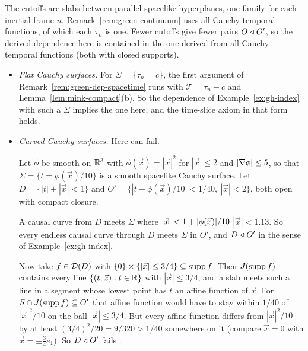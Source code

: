 \begin{remark}\label{rem:mink-slabs}
The cutoffs are slabs between parallel spacelike hyperplanes, one family
for each inertial frame $n$. Remark~\ref{rem:green-continuum} uses all Cauchy temporal functions, of
which each $\tau_n$ is one. Fewer cutoffs give fewer pairs $O\mathrel{\triangleleft} O'$, so the derived dependence here
is contained in the one derived from all Cauchy temporal functions (both with closed supports).
\begin{itemize}[leftmargin=2em]
\item \emph{Flat Cauchy surfaces.} For $\Sigma=\{\tau_n=c\}$, the first argument of
Remark~\ref{rem:green-dep-spacetime} runs with $\mathcal T=\tau_n-c$ and
Lemma~\ref{lem:mink-compact}(b). So the dependence
of Example~\ref{ex:gh-index} with such a $\Sigma$ implies the one here, and the time-slice axiom in
that form holds.
\item \emph{Curved Cauchy surfaces.} Here  can fail.

 Let $\phi$ be smooth on $\mathbb R^3$
with $\phi(\vec x)=|\vec x|^2$ for $|\vec x|\le2$ and $|\nabla\phi|\le5$, so that
$\Sigma=\{t=\phi(\vec x)/10\}$ is a smooth spacelike Cauchy surface.  Let
$D=\{|t|+|\vec x|<1\}$ and $O'=\{|t-\phi(\vec x)/10|<1/40,\ |\vec x|<2\}$, both open with compact
closure.

A causal curve from $D$ meets $\Sigma$ where $|\vec x|<1+|\phi(\vec x)|/10$ $|\vec x|<1.13$. So every endless causal curve through $D$ meets
$\Sigma$ in $O'$, and $D\mathrel{\triangleleft} O'$ in the sense of Example~\ref{ex:gh-index}.

 Now take $f\in\mathcal D(D)$ with
$\{0\}\times\{|\vec x|\le3/4\}\subseteq\operatorname{supp} f$. Then $J(\operatorname{supp} f)$ contains every line
$\{(t,\vec x):t\in\mathbb R\}$ with $|\vec x|\le3/4$, and a slab meets such a line in a segment whose lowest
point has $t$ an affine function of $\vec x$. For $S\cap J(\operatorname{supp} f)\subseteq O'$ that affine function
would have to stay within $1/40$ of $|\vec x|^2/10$ on the ball $|\vec x|\le3/4$. But every affine
function differs from $|\vec x|^2/10$ by at least $(3/4)^2/20=9/320>1/40$ somewhere on it (compare
$\vec x=0$ with $\vec x=\pm\tfrac34e_1$). So $D\mathrel{\triangleleft} O'$ fails .


\end{itemize}
\end{remark}
